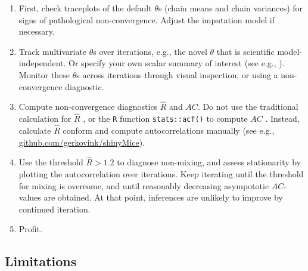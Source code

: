 \documentclass[Royal,times,sageh]{sagej}
\begin{document}
\begin{enumerate}
\def\labelenumi{\arabic{enumi}.}
\item
  First, check traceplots of the default \(\theta\)s (chain means and chain variances) for signs of pathological non-convergence. Adjust the imputation model if necessary.
\item
  Track multivariate \(\theta\)s over iterations, e.g., the novel \(\theta\) that is scientific model-independent. Or specify your own scalar summary of interest (see e.g., \citet{buur18}). Monitor these \(\theta\)s across iterations through visual inspection, or using a non-convergence diagnostic.
\item
  Compute non-convergence diagnostics \(\widehat{R}\) and \(AC\). Do not use the traditional calculation for \(\widehat{R}\) \citep{gelm92}, or the \texttt{R} function \texttt{stats::acf()} to compute \(AC\) \citep{R}. Instead, calculate \(\widehat{R}\) conform \citet{veht19} and compute autocorrelations manually (see e.g., \href{https://github.com/gerkovink/shinyMice/tree/master/3.Thesis/1.SimulationStudy}{github.com/gerkovink/shinyMice}).
\item
  Use the threshold \(\widehat{R}>1.2\) to diagnose non-mixing, and assess stationarity by plotting the autocorrelation over iterations. Keep iterating until the threshold for mixing is overcome, and until reasonably decreasing asympototic \(AC\)-values are obtained. At that point, inferences are unlikely to improve by continued iteration.
\item
  Profit.
\end{enumerate}

\hypertarget{limitations}{%
\subsection{Limitations}\label{limitations}}
\end{document}
